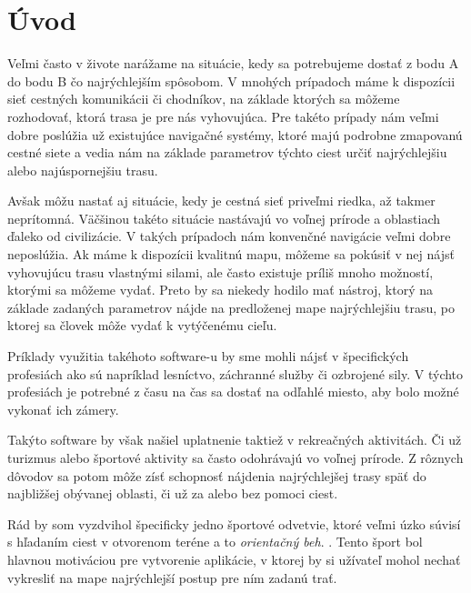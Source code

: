 \chapter*{Úvod}

Veľmi často v živote narážame na situácie, kedy sa potrebujeme dostať z bodu A do bodu B čo najrýchlejším spôsobom. V mnohých prípadoch máme k dispozícii sieť cestných komunikácii či chodníkov, na základe ktorých sa môžeme rozhodovať, ktorá trasa je pre nás vyhovujúca. Pre takéto prípady nám veľmi dobre poslúžia už existujúce navigačné systémy, ktoré majú podrobne zmapovanú cestné siete a vedia nám na základe parametrov týchto ciest určiť najrýchlejšiu alebo najúspornejšiu trasu.

Avšak môžu nastať aj situácie, kedy je cestná sieť priveľmi riedka, až takmer neprítomná. Väčšinou takéto situácie nastávajú vo voľnej prírode a oblastiach ďaleko od civilizácie. V takých prípadoch nám konvenčné navigácie veľmi dobre neposlúžia. Ak máme k dispozícii kvalitnú mapu, môžeme sa pokúsiť v nej nájsť vyhovujúcu trasu vlastnými silami, ale často existuje príliš mnoho možností, ktorými sa môžeme vydať. Preto by sa niekedy hodilo mať nástroj, ktorý na základe zadaných parametrov nájde na predloženej mape najrýchlejšiu trasu, po ktorej sa človek môže vydať k vytýčenému cieľu.

Príklady využitia takéhoto software-u by sme mohli nájsť v špecifických profesiách ako sú napríklad lesníctvo, záchranné služby či ozbrojené sily. V týchto profesiách je potrebné z času na čas sa dostať na odľahlé miesto, aby bolo možné vykonať ich zámery.

Takýto software by však našiel uplatnenie taktiež v rekreačných aktivitách. Či už turizmus alebo športové aktivity sa často odohrávajú vo voľnej prírode. Z rôznych dôvodov sa potom môže zísť schopnosť nájdenia najrýchlejšej trasy späť do najbližšej obývanej oblasti, či už za alebo bez pomoci ciest. 

Rád by som vyzdvihol špecificky jedno športové odvetvie, ktoré veľmi úzko súvisí s hľadaním ciest v otvorenom teréne a to \textit{orientačný beh}. \cite{CoJeOrientak}. Tento šport bol hlavnou motiváciou pre vytvorenie aplikácie, v ktorej by si užívateľ mohol nechať vykresliť na mape najrýchlejší postup pre ním zadanú trať. 

